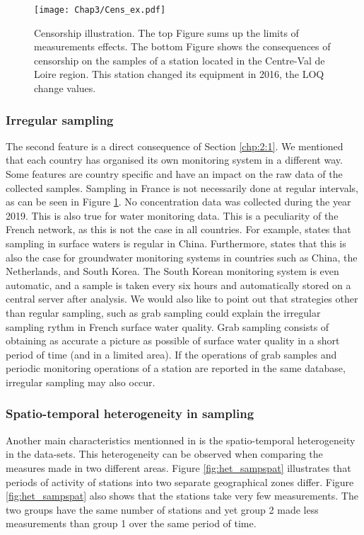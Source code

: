 \begin{figure}
    \centering
    \texttt{[image: Chap3/Cens\_ex.pdf]}
    \caption{Censorship illustration. The top Figure sums up the limits of measurements effects. The bottom Figure shows the consequences of censorship on the samples of a station located in the Centre-Val de Loire region. This station changed its equipment in 2016, the LOQ change values.}
    \label{fig:cens_ex}
\end{figure}

\subsubsection{Irregular sampling}

The second feature is a direct consequence of Section \ref{chp:2:1}. We mentioned that each country has organised its own monitoring system in a different way. Some features are country specific and have an impact on the raw data of the collected samples. Sampling in France is not necessarily done at regular intervals, as can be seen in Figure \ref{fig:cens_ex}. No concentration data was collected during the year 2019. This is also true for water monitoring data. This is a peculiarity of the French network, as this is not the case in all countries. For example, \cite{Zhang2008} states that sampling in surface waters is regular in China. Furthermore, \cite{Joergensen2008} states that this is also the case for groundwater monitoring systems in countries such as China, the Netherlands, and South Korea. The South Korean monitoring system is even automatic, and a sample is taken every six hours and automatically stored on a central server after analysis. We would also like to point out that strategies other than regular sampling, such as grab sampling \cite{Novic2017} could explain the irregular sampling rythm in French surface water quality. Grab sampling consists of obtaining as accurate a picture as possible of surface water quality in a short period of time (and in a limited area). If the operations of grab samples and periodic monitoring operations of a station are reported in the same database, irregular sampling may also occur.  

\subsubsection{Spatio-temporal heterogeneity in sampling}

Another main characteristics mentionned in \cite{Baran2022} is the spatio-temporal heterogeneity in the data-sets. This heterogeneity can be observed when comparing the measures made in two different areas. Figure \ref{fig:het_sampspat} illustrates that periods of activity of stations into two separate geographical zones differ. Figure \ref{fig:het_sampspat} also shows that the stations take very few measurements. The two groups have the same number of stations and yet group 2 made less measurements than group 1 over the same period of time.   

